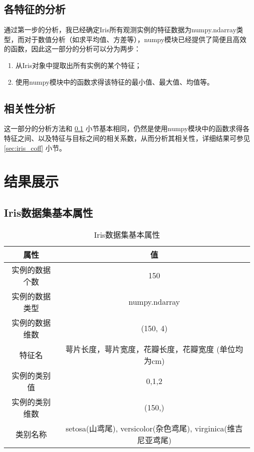 \documentclass[12pt,a4paper]{article}
\theoremstyle{definition}
\begin{document}
\subsection{各特征的分析}
\label{sec:app_attri}

通过第一步的分析，我已经确定Iris所有观测实例的特征数据为numpy.ndarray类型，而对于数值分析（如求平均值、方差等），numpy模块已经提供了简便且高效的函数，因此这一部分的分析可以分为两步：

\begin{enumerate}
	\item 从Iris对象中提取出所有实例的某个特征；
	
	\item  使用numpy模块中的函数求得该特征的最小值、最大值、均值等。
\end{enumerate}

\subsection{相关性分析}

这一部分的分析方法和 \ref{sec:app_attri} 小节基本相同，仍然是使用numpy模块中的函数求得各特征之间、以及特征与目标之间的相关系数，从而分析其相关性，详细结果可参见 \ref{sec:iris_coff} 小节。

\section{结果展示}

\subsection{Iris数据集基本属性}
\label{sec:iris_basic}
\begin{table}[H]
	\renewcommand\arraystretch{1.35}
	\caption{Iris数据集基本属性}
	\label{tab:iris_basic}
	\centering
	
	\begin{tabular}{c|c}
		\centering
		属性 & 值 \\
		\hline
		实例的数据个数 & 150 \\
		实例的数据类型 & numpy.ndarray \\
		实例的数据维数 & (150, 4) \\
		特征名 & 萼片长度，萼片宽度，花瓣长度，花瓣宽度 (单位均为cm) \\
		实例的类别值 & 0,1,2 \\
		实例的类别维数 & (150,) \\
		类别名称 & setosa(山鸢尾), versicolor(杂色鸢尾), virginica(维吉尼亚鸢尾) \\
	\end{tabular}
\end{table}
\end{document}
